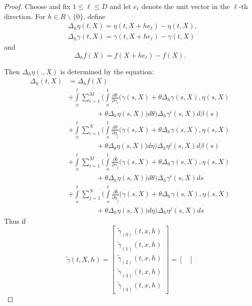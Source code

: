 \begin{proof}
Choose and fix $1 \le \ell \le D$ and let $e_\ell$ denote the unit
vector in the $\ell$-th direction. For $h \in R \backslash \{0 \}$,
define 
\begin{align*}
& \Delta_h \eta (t,X)= \eta (t,X + he_\ell)- \eta (t,X),\\[4pt] 
& \Delta_h \gamma(t,X)= \gamma (t,X+he_\ell) -\gamma (t,X) 
\end{align*}
and\pageoriginale 
$$
\Delta_h f(X)= f(X+ he_\ell)-f(X).
$$

Then $\Delta_h \eta(.,X)$ is determined by the equation: 
\begin{align*}
\Delta_h (t,X)&= \Delta _h f(X)\\ 
&+ \int\limits^t_o \sum^M _{i=1} (\int\limits^1_o \frac{\partial
  \hat{\sigma}}{\partial \gamma_i}(\gamma (s,X)+ \theta \Delta_h
\gamma (s,X),\eta(s,X)\\
& \qquad \qquad + \theta \Delta _h \eta (s,X))d \theta) \Delta_h
\gamma^i (s,X)d \beta (s)\\ 
& +\int\limits^t_o \sum ^N _{i=1} (\int\limits^1_o \frac{\partial
  \hat{\sigma}}{\partial \eta_j}(\gamma(s,X)+ \theta \Delta_h
\gamma (s,X),\eta(s,X)\\
& \qquad \qquad + \theta \Delta_\theta \eta (s,X))d \eta) \Delta_h
\eta^j(s,X)d \beta (s)\\ 
&+\int\limits^t_o \sum^M_{i=1} (\int\limits^1_o \frac{\partial
  \hat{b}}{\partial \gamma_j}(\gamma (s,X)+ \theta \Delta_h \gamma
(s,X),\eta(s,X)\\
& \qquad \qquad + \theta \Delta_h \eta (s,X))d \theta) \Delta_h
\gamma^i(s,X)ds\\ 
&+\int\limits^t_o \sum\limits^N_{j=1} (\int\limits^t_o \frac{\partial
  \hat{b}}{\partial \eta_j}(\gamma (s,X)+ \theta \Delta_h \gamma
(s,X),\eta(s,X)\\
& \qquad \qquad + \theta \Delta_h \eta (s,X))d \eta) \Delta_h
\eta^j(s,X)ds 
\end{align*}
Thus if
\begin{equation*}
\tilde {\gamma}(t,X,h)=
\begin{bmatrix}
\tilde {\gamma}_{(0)}(t,x,h) \\ 
\tilde {\gamma}_{(1)}(t,x,h) \\ 
\tilde {\gamma}_{(2)}(t,x,h) \\ 
\tilde {\gamma}_{(3)}(t,x,h) \\ 
\tilde {\gamma}_{(4)}(t,x,h) 
\end{bmatrix}
=
\begin{bmatrix}

\end{bmatrix}
\end{equation*}
\end{proof}
